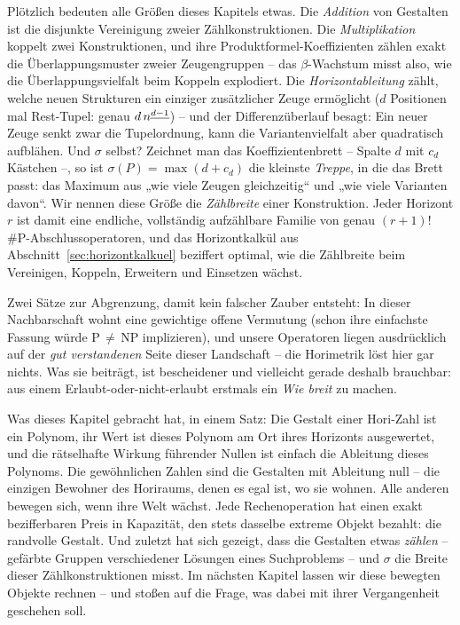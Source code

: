 Plötzlich bedeuten alle Größen dieses Kapitels etwas. Die
\emph{Addition} von Gestalten ist die disjunkte Vereinigung zweier
Zählkonstruktionen. Die \emph{Multiplikation} koppelt zwei
Konstruktionen, und ihre Produktformel-Koeffizienten zählen exakt
die Überlappungsmuster zweier Zeugengruppen -- das
$\beta$-Wachstum misst also, wie die Überlappungsvielfalt beim
Koppeln explodiert. Die \emph{Horizontableitung} zählt, welche
neuen Strukturen ein einziger zusätzlicher Zeuge ermöglicht
($d$ Positionen mal Rest-Tupel: genau $d\,n^{\underline{d-1}}$) -- und der
Differenzüberlauf besagt: Ein neuer Zeuge senkt zwar die
Tupelordnung, kann die Variantenvielfalt aber quadratisch aufblähen.
Und $\sigma$ selbst? Zeichnet man das Koeffizientenbrett -- Spalte
$d$ mit $c_d$ Kästchen --, so ist $\sigma(P)=\max(d+c_d)$ die
kleinste \emph{Treppe}, in die das Brett passt: das Maximum aus
„wie viele Zeugen gleichzeitig“ und „wie viele Varianten davon“.
Wir nennen diese Größe die \emph{Zählbreite} einer Konstruktion.
Jeder Horizont $r$ ist damit eine endliche, vollständig
aufzählbare Familie von genau $(r{+}1)!$
\#P-Abschlussoperatoren, und das Horizontkalkül aus
Abschnitt~\ref{sec:horizontkalkuel} beziffert optimal, wie die
Zählbreite beim Vereinigen, Koppeln, Erweitern und Einsetzen
wächst.

Zwei Sätze zur Abgrenzung, damit kein falscher Zauber entsteht: In
dieser Nachbarschaft wohnt eine gewichtige offene Vermutung (schon
ihre einfachste Fassung würde P$\,\ne\,$NP implizieren), und
unsere Operatoren liegen ausdrücklich auf der \emph{gut
verstandenen} Seite dieser Landschaft -- die Horimetrik löst hier
gar nichts. Was sie beiträgt, ist bescheidener und vielleicht
gerade deshalb brauchbar: aus einem Erlaubt-oder-nicht-erlaubt
erstmals ein \emph{Wie breit} zu machen.

\begin{oberflaeche}
Was dieses Kapitel gebracht hat, in einem Satz: Die Gestalt einer
Hori-Zahl ist ein Polynom, ihr Wert ist dieses Polynom am Ort ihres
Horizonts ausgewertet, und die rätselhafte Wirkung führender Nullen
ist einfach die Ableitung dieses Polynoms. Die gewöhnlichen Zahlen
sind die Gestalten mit Ableitung null -- die einzigen Bewohner des
Horiraums, denen es egal ist, wo sie wohnen. Alle anderen bewegen
sich, wenn ihre Welt wächst. Jede Rechenoperation hat einen exakt
bezifferbaren Preis in Kapazität, den stets dasselbe extreme
Objekt bezahlt: die randvolle Gestalt. Und zuletzt hat sich
gezeigt, dass die Gestalten etwas \emph{zählen} -- gefärbte
Gruppen verschiedener Lösungen eines Suchproblems -- und $\sigma$
die Breite dieser Zählkonstruktionen misst. Im nächsten Kapitel
lassen wir diese bewegten Objekte rechnen -- und stoßen auf die
Frage, was dabei mit ihrer Vergangenheit geschehen soll.
\end{oberflaeche}
